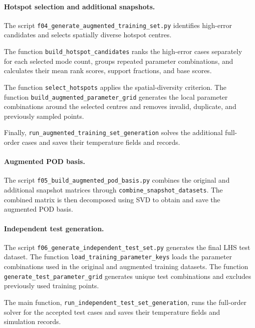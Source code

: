 \paragraph{Hotspot selection and additional snapshots.}

The script
\texttt{f04\_generate\_augmented\_training\_set.py}
identifies high-error candidates and selects
spatially diverse hotspot centres.

The function \texttt{build\_hotspot\_candidates}
ranks the high-error cases separately for each
selected mode count, groups repeated parameter
combinations, and calculates their mean rank
scores, support fractions, and base scores.

The function \texttt{select\_hotspots} applies
the spatial-diversity criterion. The function
\texttt{build\_augmented\_parameter\_grid}
generates the local parameter combinations
around the selected centres and removes
invalid, duplicate, and previously sampled
points.

Finally, \texttt{run\_augmented\_training\_set\_generation}
solves the additional full-order cases and
saves their temperature fields and records.

\paragraph{Augmented POD basis.}

The script
\texttt{f05\_build\_augmented\_pod\_basis.py}
combines the original and additional snapshot
matrices through
\texttt{combine\_snapshot\_datasets}. The
combined matrix is then decomposed using SVD
to obtain and save the augmented POD basis.

\paragraph{Independent test generation.}

The script
\texttt{f06\_generate\_independent\_test\_set.py}
generates the final LHS test dataset. The
function \texttt{load\_training\_parameter\_keys}
loads the parameter combinations used in the
original and augmented training datasets.
The function \texttt{generate\_test\_parameter\_grid}
generates unique test combinations and excludes
previously used training points.

The main function,
\texttt{run\_independent\_test\_set\_generation},
runs the full-order solver for the accepted
test cases and saves their temperature fields
and simulation records.


